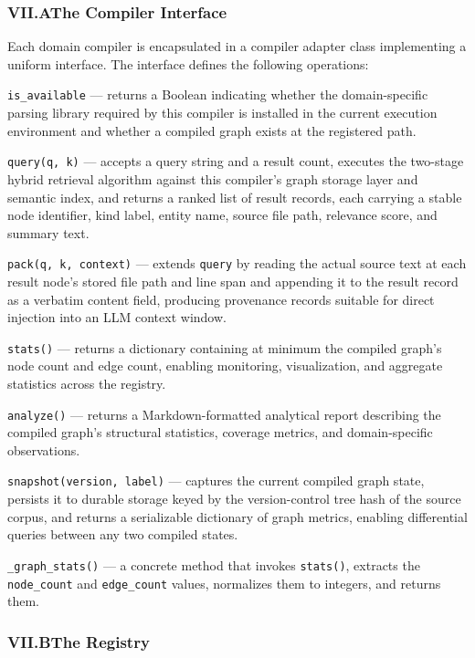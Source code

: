 \documentclass[12pt]{article}
\begin{document}
\subsubsection{VII.A\quad The Compiler Interface}

Each domain compiler is encapsulated in a compiler adapter class implementing a
uniform interface. The interface defines the following operations:

\texttt{is\_available} --- returns a Boolean indicating whether the
domain-specific parsing library required by this compiler is installed in the
current execution environment and whether a compiled graph exists at the
registered path.

\texttt{query(q, k)} --- accepts a query string and a result count, executes the
two-stage hybrid retrieval algorithm against this compiler's graph storage layer
and semantic index, and returns a ranked list of result records, each carrying a
stable node identifier, kind label, entity name, source file path, relevance
score, and summary text.

\texttt{pack(q, k, context)} --- extends \texttt{query} by reading the actual
source text at each result node's stored file path and line span and appending it
to the result record as a verbatim content field, producing provenance records
suitable for direct injection into an LLM context window.

\texttt{stats()} --- returns a dictionary containing at minimum the compiled
graph's node count and edge count, enabling monitoring, visualization, and
aggregate statistics across the registry.

\texttt{analyze()} --- returns a Markdown-formatted analytical report describing
the compiled graph's structural statistics, coverage metrics, and domain-specific
observations.

\texttt{snapshot(version, label)} --- captures the current compiled graph state,
persists it to durable storage keyed by the version-control tree hash of the
source corpus, and returns a serializable dictionary of graph metrics, enabling
differential queries between any two compiled states.

\texttt{\_graph\_stats()} --- a concrete method that invokes \texttt{stats()},
extracts the \texttt{node\_count} and \texttt{edge\_count} values, normalizes
them to integers, and returns them.

\subsubsection{VII.B\quad The Registry}
\end{document}
